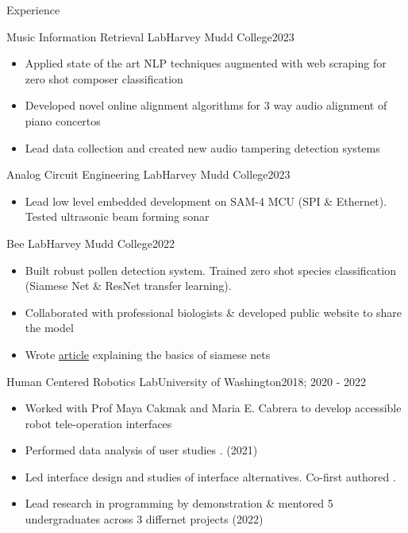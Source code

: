 \documentclass[]{mcdowellcv}
\begin{document}
\begin{cvsection}{Experience}
	\begin{cvsubsection}{Music Information Retrieval Lab}{Harvey Mudd College}{2023}
		\begin{itemize}
			\item Applied state of the art NLP techniques augmented with web scraping for zero shot composer classification
			\item Developed novel online alignment algorithms for 3 way audio alignment of piano concertos
			\item Lead data collection and created new audio tampering detection systems
		\end{itemize}
	\end{cvsubsection}
	\begin{cvsubsection}{Analog Circuit Engineering Lab}{Harvey Mudd College}{2023}
		\begin{itemize}
			\item Lead low level embedded development on SAM-4 MCU (SPI \& Ethernet). Tested ultrasonic beam forming sonar
		\end{itemize}
	\end{cvsubsection}
	\begin{cvsubsection}{Bee Lab}{Harvey Mudd College}{2022}
		\begin{itemize}
			\item Built robust pollen detection system. Trained zero shot species classification (Siamese Net \& ResNet transfer learning).
			\item Collaborated with professional biologists \& developed public website to share the model
			\item Wrote \href{https://hmcbee.blogspot.com/2022/12/blue-bees-twin-neural-networks-and-more.html}{article} explaining the basics of siamese nets
		\end{itemize}
	\end{cvsubsection}
	\begin{cvsubsection}{Human Centered Robotics Lab}{University of Washington}{2018; 2020 - 2022}
		\begin{itemize}
			\item Worked with Prof Maya Cakmak and Maria E. Cabrera to develop accessible robot tele-operation interfaces
			\item Performed data analysis of user studies \cite{CabreraBDC21}. (2021)
			\item Led interface design and studies of interface alternatives. Co-first authored  \cite{CabreraDKBC21}.
			\item Lead research in programming by demonstration \& mentored 5 undergraduates across 3 differnet projects (2022)
		\end{itemize}
	\end{cvsubsection}


\end{cvsection}
\end{document}
